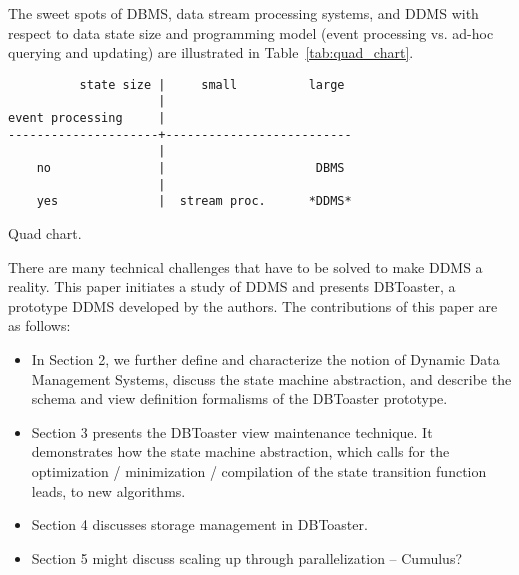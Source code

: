 The sweet spots of DBMS, data stream processing systems, and DDMS with
respect to data state size and programming model (event processing vs. ad-hoc querying and updating) are illustrated in Table~\ref{tab:quad_chart}.

\begin{table}
\begin{verbatim}
          state size |     small          large
                     |
event processing     |
---------------------+--------------------------
                     |
    no               |                     DBMS
                     |
    yes              |  stream proc.      *DDMS*
\end{verbatim}
\caption{Quad chart.}
\label{tab:quad_chart}
\end{table}




There are many technical challenges that have to be solved to make DDMS a reality. This paper initiates a study of DDMS and presents DBToaster, a prototype DDMS developed by the authors. The contributions of this paper are as follows:

\begin{itemize}
\item 
In Section 2, we further define and characterize the notion of Dynamic Data Management Systems, discuss the state machine abstraction, and describe the schema and view definition formalisms of the DBToaster prototype.

\item
Section 3 presents the DBToaster view maintenance technique. It demonstrates how the state machine abstraction, which calls for the optimization / minimization / compilation of the state transition function leads, to new algorithms.

\item
Section 4 discusses storage management in DBToaster.

\item
Section 5 might discuss scaling up through parallelization -- Cumulus?
\end{itemize}

